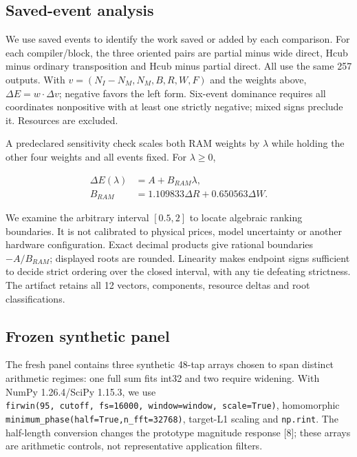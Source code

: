 \documentclass[conference]{IEEEtran}
\begin{document}
\subsection{Saved-event analysis}\label{saved-event-analysis}

We use saved events to identify the work saved or added by each
comparison. For each compiler/block, the three oriented pairs are
partial minus wide direct, Hcub minus ordinary transposition and Hcub
minus partial direct. All use the same 257 outputs. With
\(v=(N_I-N_M,N_M,B,R,W,F)\) and the weights above,
\(\Delta E=w\cdot\Delta v\); negative favors the left form. Six-event
dominance requires all coordinates nonpositive with at least one
strictly negative; mixed signs preclude it. Resources are excluded.

A predeclared sensitivity check scales both RAM weights by \(\lambda\)
while holding the other four weights and all events fixed. For
\(\lambda\ge0\),

\[
\begin{aligned}
\Delta E(\lambda)&=A+B_{RAM}\lambda,\\
B_{RAM}&=1.109833\Delta R+0.650563\Delta W.
\end{aligned}
\]

We examine the arbitrary interval \([0.5,2]\) to locate algebraic
ranking boundaries. It is not calibrated to physical prices, model
uncertainty or another hardware configuration. Exact decimal products
give rational boundaries \(-A/B_{RAM}\); displayed roots are rounded.
Linearity makes endpoint signs sufficient to decide strict ordering over
the closed interval, with any tie defeating strictness. The artifact
retains all 12 vectors, components, resource deltas and root
classifications.

\subsection{Frozen synthetic panel}\label{frozen-synthetic-panel}

The fresh panel contains three synthetic 48-tap arrays chosen to span
distinct arithmetic regimes: one full sum fits int32 and two require
widening. With NumPy 1.26.4/SciPy 1.15.3, we use
\texttt{firwin(95,\ cutoff,\ fs=16000,\ window=window,\ scale=True)},
homomorphic \texttt{minimum\_phase(half=True,n\_fft=32768)}, target-L1
scaling and \texttt{np.rint}. The half-length conversion changes the
prototype magnitude response {[}8{]}; these arrays are arithmetic
controls, not representative application filters.
\end{document}
